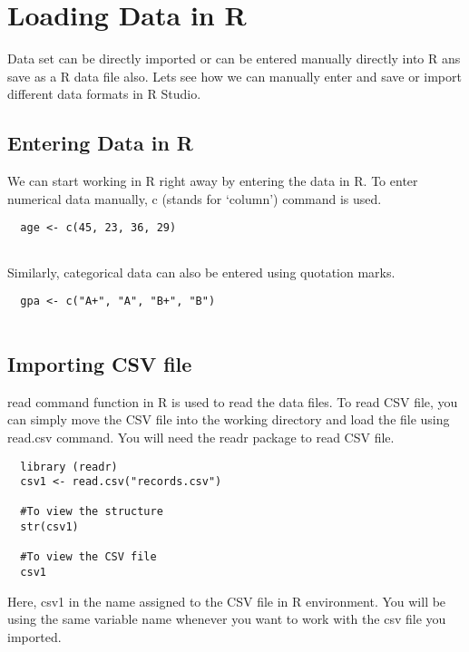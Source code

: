 \documentclass[
]{book}
\begin{document}
\hypertarget{loading-data-in-r}{%
\chapter{Loading Data in R}\label{loading-data-in-r}}

Data set can be directly imported or can be entered manually directly into R ans save as a R data file also. Lets see how we can manually enter and save or import different data formats in R Studio.

\hypertarget{entering-data-in-r}{%
\section{Entering Data in R}\label{entering-data-in-r}}

We can start working in R right away by entering the data in R. To enter numerical data manually, c (stands for `column') command is used.

\begin{verbatim}
  age <- c(45, 23, 36, 29)
  
\end{verbatim}

Similarly, categorical data can also be entered using quotation marks.

\begin{verbatim}
  gpa <- c("A+", "A", "B+", "B")
  
\end{verbatim}

\hypertarget{importing-csv-file}{%
\section{Importing CSV file}\label{importing-csv-file}}

read command function in R is used to read the data files. To read CSV file, you can simply move the CSV file into the working directory and load the file using read.csv command. You will need the readr package to read CSV file.

\begin{verbatim}
  library (readr)
  csv1 <- read.csv("records.csv")
  
  #To view the structure
  str(csv1)
  
  #To view the CSV file
  csv1
\end{verbatim}

Here, csv1 in the name assigned to the CSV file in R environment. You will be using the same variable name whenever you want to work with the csv file you imported.
\end{document}

